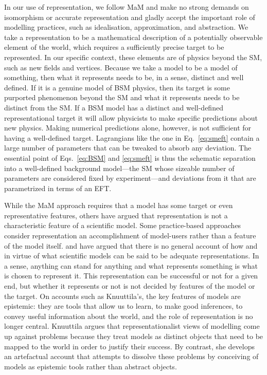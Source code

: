In our use of representation, we follow MaM and make no strong demands on isomorphism or accurate representation and gladly accept the important role of modelling practices, such as idealisation, approximation, and abstraction. 
We take a representation to be a mathematical description of a potentially observable element of the world, which requires a sufficiently precise target to be represented.
In our specific context, these elements are of physics beyond the SM, such as new fields and vertices.
Because we take a model to be a model of something, then what it represents needs to be, in a sense, distinct and well defined. 
If it is a genuine model of BSM physics, then its target is some purported phenomenon beyond the SM and what it represents needs to be distinct from the SM. 
If a BSM model has a distinct and well-defined representational target it will allow physicists to make specific predictions about new physics.
Making numerical predictions alone, however, is not sufficient for having a well-defined target. 
Lagrangians like the one in Eq.~\ref{eq:smeft} contain a large number of parameters that can be tweaked to absorb any deviation. 
The essential point of Eqs.~\ref{eq:BSM} and \ref{eq:smeft} is thus the schematic separation into a well-defined background model---the SM whose sizeable number of parameters are considered fixed by experiment---and deviations from it that are parametrized in terms of an EFT.

While the MaM approach requires that a model has some target or even representative features, others have argued  
that representation is not a characteristic feature of a scientific model.
Some practice-based approaches consider representation an accomplishment of model-users rather than a feature of the model itself.
\citet{knuuttila2011,Knuuttila2017} and \citet{teller01} have argued that there is no general account of how and in virtue of what scientific models can be said to be adequate representations. 
In a sense, anything can stand for anything and what represents something is what is chosen to represent it.
This representation can be successful or not for a given end, but whether it represents or not is not decided by features of the model or the target.
On accounts such as Knuuttila's, the key features of models are epistemic: they are tools that allow us to learn, to make good inferences, to convey useful information about the world, and the role of representation is no longer central.
Knuuttila argues that representationalist views of modelling come up against problems because they treat models as distinct objects that need to be mapped to the world in order to justify their success. 
By contrast, she develops an artefactual account that attempts to dissolve these problems by conceiving of models as epistemic tools rather than abstract objects.

